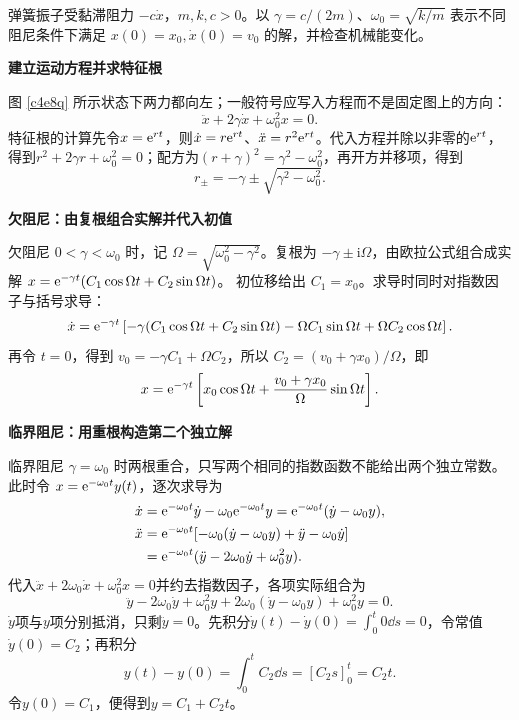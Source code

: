 \begin{question}
\begin{example}[阻尼振动的三种情形]
弹簧振子受黏滞阻力 $-c\dot x$，$m,k,c>0$。以 $\gamma=c/(2m)$、$\omega_0=\sqrt{k/m}$ 表示不同阻尼条件下满足 $x(0)=x_0,\dot x(0)=v_0$ 的解，并检查机械能变化。
\end{example}
\end{question}
\begin{solution}\textbf{建立运动方程并求特征根}\par\nobreak
图 \ref{c4e8q} 所示状态下两力都向左；一般符号应写入方程而不是固定图上的方向：
\[
 \ddot x+2\gamma\dot x+\omega_0^2x=0.
\]
特征根的计算先令$x=\mathrm e^{rt}$，则$\dot x=r\mathrm e^{rt}$、$\ddot x=r^2\mathrm e^{rt}$。代入方程并除以非零的$\mathrm e^{rt}$，得到$r^2+2\gamma r+\omega_0^2=0$；配方为$(r+\gamma)^2=\gamma^2-\omega_0^2$，再开方并移项，得到
\[
r_\pm=-\gamma\pm\sqrt{\gamma^2-\omega_0^2}.
\]

\par\medskip{}\noindent\textbf{欠阻尼：由复根组合实解并代入初值}\par\nobreak
欠阻尼 $0<\gamma<\omega_0$ 时，记 $\Omega=\sqrt{\omega_0^2-\gamma^2}$。复根为 $-\gamma\pm\mathrm i\Omega$，由欧拉公式组合成实解
$x=\mathrm e^{-\gamma t}(C_1\cos\Omega t+C_2\sin\Omega t)$。
初位移给出 $C_1=x_0$。求导时同时对指数因子与括号求导：
\[
 \dot x=\mathrm e^{-\gamma t}\left[
 -\gamma(C_1\cos\Omega t+C_2\sin\Omega t)
 -\Omega C_1\sin\Omega t+\Omega C_2\cos\Omega t\right].
\]
再令 $t=0$，得到 $v_0=-\gamma C_1+\Omega C_2$，所以 $C_2=(v_0+\gamma x_0)/\Omega$，即
\[
 x=\mathrm e^{-\gamma t}
 \left[x_0\cos\Omega t+\frac{v_0+\gamma x_0}{\Omega}\sin\Omega t\right].
\]
\par\medskip{}\noindent\textbf{临界阻尼：用重根构造第二个独立解}\par\nobreak
临界阻尼 $\gamma=\omega_0$ 时两根重合，只写两个相同的指数函数不能给出两个独立常数。此时令 $x=\mathrm e^{-\omega_0t}y(t)$，逐次求导为
\begin{align*}
\dot x&=\mathrm e^{-\omega_0t}\dot y-\omega_0\mathrm e^{-\omega_0t}y
=\mathrm e^{-\omega_0t}(\dot y-\omega_0y),\\
\ddot x&=\mathrm e^{-\omega_0t}
 [-\omega_0(\dot y-\omega_0y)+\ddot y-\omega_0\dot y]\\
&=\mathrm e^{-\omega_0t}(\ddot y-2\omega_0\dot y+\omega_0^2y).
\end{align*}
代入$\ddot x+2\omega_0\dot x+\omega_0^2x=0$并约去指数因子，各项实际组合为
\[
\ddot y-2\omega_0\dot y+\omega_0^2y
+2\omega_0(\dot y-\omega_0y)+\omega_0^2y=0.
\]
$\dot y$项与$y$项分别抵消，只剩$\ddot y=0$。先积分$\dot y(t)-\dot y(0)=\int_0^t0\dd s=0$，令常值$\dot y(0)=C_2$；再积分
\[
y(t)-y(0)=\int_0^t C_2\dd s=[C_2s]_0^t=C_2t.
\]
令$y(0)=C_1$，便得到$y=C_1+C_2t$。


\end{solution}
